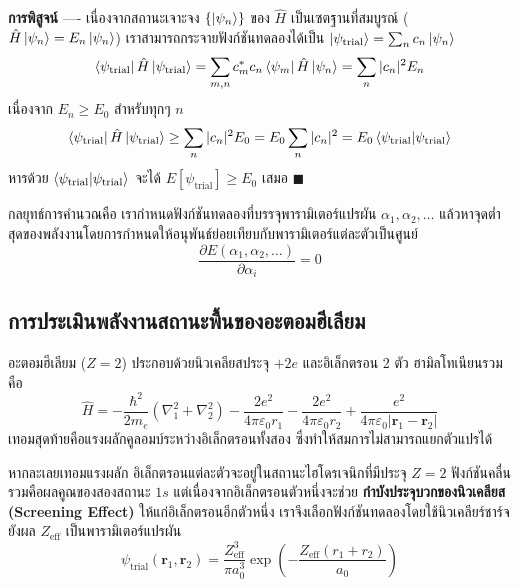 \textbf{การพิสูจน์} ---- เนื่องจากสถานะเจาะจง $\{ \ket{\psi_n} \}$ ของ $\hat{H}$ เป็นเซตฐานที่สมบูรณ์ ($\hat{H}\ket{\psi_n} = E_n\ket{\psi_n}$) เราสามารถกระจายฟังก์ชันทดลองได้เป็น $\ket{\psi_{\text{trial}}} = \sum_n c_n \ket{\psi_n}$
\begin{equation}
\bra{\psi_{\text{trial}}} \hat{H} \ket{\psi_{\text{trial}}} = \sum_{m, n} c_m^* c_n \bra{\psi_m}\hat{H}\ket{\psi_n} = \sum_n |c_n|^2 E_n
\end{equation}
เนื่องจาก $E_n \ge E_0$ สำหรับทุกๆ $n$
\begin{equation}
\bra{\psi_{\text{trial}}} \hat{H} \ket{\psi_{\text{trial}}} \ge \sum_n |c_n|^2 E_0 = E_0 \sum_n |c_n|^2 = E_0 \braket{\psi_{\text{trial}}}{\psi_{\text{trial}}}
\end{equation}
หารด้วย $\braket{\psi_{\text{trial}}}{\psi_{\text{trial}}}$ จะได้ $E[\psi_{\text{trial}}] \ge E_0$ เสมอ $\blacksquare$

กลยุทธ์การคำนวณคือ เรากำหนดฟังก์ชันทดลองที่บรรจุพารามิเตอร์แปรผัน $\alpha_1, \alpha_2, \dots$ แล้วหาจุดต่ำสุดของพลังงานโดยการกำหนดให้อนุพันธ์ย่อยเทียบกับพารามิเตอร์แต่ละตัวเป็นศูนย์
\begin{equation}
\frac{\partial E(\alpha_1, \alpha_2, \dots)}{\partial \alpha_i} = 0
\end{equation}

\subsection{การประเมินพลังงานสถานะพื้นของอะตอมฮีเลียม}
อะตอมฮีเลียม ($Z = 2$) ประกอบด้วยนิวเคลียสประจุ $+2e$ และอิเล็กตรอน 2 ตัว ฮามิลโทเนียนรวมคือ
\begin{equation}
\hat{H} = -\frac{\hbar^2}{2m_e}(\nabla_1^2 + \nabla_2^2) - \frac{2e^2}{4\pi\varepsilon_0 r_1} - \frac{2e^2}{4\pi\varepsilon_0 r_2} + \frac{e^2}{4\pi\varepsilon_0 |\mathbf{r}_1 - \mathbf{r}_2|}
\end{equation}
เทอมสุดท้ายคือแรงผลักคูลอมบ์ระหว่างอิเล็กตรอนทั้งสอง ซึ่งทำให้สมการไม่สามารถแยกตัวแปรได้

หากละเลยเทอมแรงผลัก อิเล็กตรอนแต่ละตัวจะอยู่ในสถานะไฮโดรเจนิกที่มีประจุ $Z = 2$ ฟังก์ชันคลื่นรวมคือผลคูณของสองสถานะ $1s$ แต่เนื่องจากอิเล็กตรอนตัวหนึ่งจะช่วย \textbf{กำบังประจุบวกของนิวเคลียส (Screening Effect)} ให้แก่อิเล็กตรอนอีกตัวหนึ่ง เราจึงเลือกฟังก์ชันทดลองโดยใช้นิวเคลียร์ชาร์จยังผล $Z_{\text{eff}}$ เป็นพารามิเตอร์แปรผัน
\begin{equation}
\psi_{\text{trial}}(\mathbf{r}_1, \mathbf{r}_2) = \frac{Z_{\text{eff}}^3}{\pi a_0^3} \exp\left( -\frac{Z_{\text{eff}}(r_1 + r_2)}{a_0} \right)
\end{equation}

